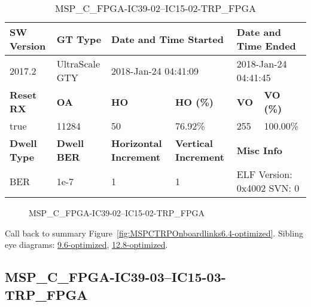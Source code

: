 \begin{table}[h]
\centering
\caption{MSP\_C\_FPGA-IC39-02--IC15-02-TRP\_FPGA}
\label{tab:MSPCFPGAIC3902IC1502TRPFPGA6.4-optimized}
\begin{tabular}{@{}|l|l|l|l|l|l|@{}}
\toprule
\textbf{SW Version}                & \textbf{GT Type}   & \multicolumn{2}{l|}{\textbf{Date and Time Started}}            & \multicolumn{2}{l|}{\textbf{Date and Time Ended}}        \\ \midrule
2017.2                       & UltraScale GTY          & \multicolumn{2}{l|}{2018-Jan-24 04:41:09}                   & \multicolumn{2}{l|}{2018-Jan-24 04:41:45}               \\ \midrule
\textbf{Reset RX}                  & \textbf{OA} & \textbf{HO}   & \textbf{HO (\%)} & \textbf{VO} & \textbf{VO (\%)} \\ \midrule
true & 11284        & 50          & 76.92\%        & 255        & 100.00\%       \\ \midrule
\textbf{Dwell Type}                & \textbf{Dwell BER} & \textbf{Horizontal Increment} & \textbf{Vertical Increment}    & \multicolumn{2}{l|}{\textbf{Misc Info}}                  \\ \midrule
BER                            & 1e-7        & 1        & 1           & \multicolumn{2}{l|}{ELF Version: 0x4002 SVN: 0}                         \\ \bottomrule
\end{tabular}
\end{table}

\begin{figure}[h]
\caption{MSP\_C\_FPGA-IC39-02--IC15-02-TRP\_FPGA} \label{fig:MSPCFPGAIC3902IC1502TRPFPGA6.4-optimized}
\end{figure}

Call back to summary Figure~\ref{fig:MSPCTRPOnboardlinks6.4-optimized}.
Sibling eye diagrams: \hyperref[sec:MSPCFPGAIC3902IC1502TRPFPGA9.6-optimized]{9.6-optimized}, \hyperref[sec:MSPCFPGAIC3902IC1502TRPFPGA12.8-optimized]{12.8-optimized}.

\clearpage
\newpage


\subsection{MSP\_C\_FPGA-IC39-03--IC15-03-TRP\_FPGA}\label{sec:MSPCFPGAIC3903IC1503TRPFPGA6.4-optimized}

